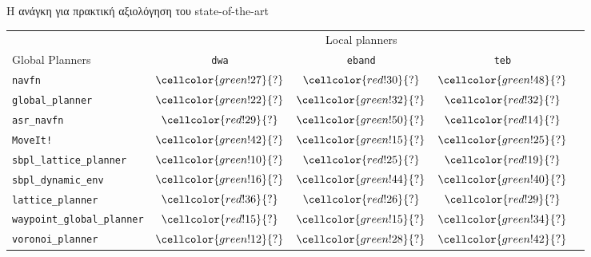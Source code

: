 \begin{frame}{Η ανάγκη για πρακτική αξιολόγηση του state-of-the-art}
{\footnotesize
\begin{table}[h]
\begin{tabular}{lcccc}
  & \multicolumn{3}{c}{Local planners} \\
  \cline{2-4}
  Global Planners                     & \texttt{dwa}                               & \texttt{eband}                             & \texttt{teb} \\ \toprule
  \texttt{navfn}                     & $\cellcolor{green!27}{?}$         & $\cellcolor{red!30}{?}$            & $\cellcolor{green!48}{?}$         \\
  \texttt{global\_planner}           & $\cellcolor{green!22}{?}$         & $\cellcolor{green!32}{?}$            & $\cellcolor{red!32}{?}$         \\
  \texttt{asr\_navfn}                & $\cellcolor{red!29}{?}$         & $\cellcolor{green!50}{?}$            & $\cellcolor{red!14}{?}$         \\
  \texttt{MoveIt!}                   & $\cellcolor{green!42}{?}$         & $\cellcolor{green!15}{?}$            & $\cellcolor{green!25}{?}$         \\
  \texttt{sbpl\_lattice\_planner}    & $\cellcolor{green!10}{?}$         & $\cellcolor{red!25}{?}$            & $\cellcolor{red!19}{?}$         \\
  \texttt{sbpl\_dynamic\_env}        & $\cellcolor{green!16}{?}$         & $\cellcolor{green!44}{?}$            & $\cellcolor{green!40}{?}$         \\
  \texttt{lattice\_planner}          & $\cellcolor{red!36}{?}$         & $\cellcolor{red!26}{?}$            & $\cellcolor{red!29}{?}$         \\
  \texttt{waypoint\_global\_planner} & $\cellcolor{red!15}{?}$         & $\cellcolor{green!15}{?}$            & $\cellcolor{green!34}{?}$         \\
  \texttt{voronoi\_planner}          & $\cellcolor{green!12}{?}$         & $\cellcolor{green!28}{?}$            & $\cellcolor{green!42}{?}$         \\ \bottomrule
\end{tabular}
\end{table}
}

\end{frame}

